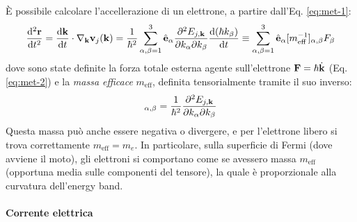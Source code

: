 È possibile calcolare l'accellerazione di un elettrone, a partire dall'Eq. \ref{eq:met-1}:
\begin{equation*}
	\frac{\mathrm{d}^2 \mathbf{r}}{\mathrm{d} t^2} = \frac{\mathrm{d} \mathbf{k}}{\mathrm{d} t} \cdot \nabla_{\mathbf{k}} \mathbf{v}_j(\mathbf{k}) = \frac{1}{\hbar^2} \sum_{\alpha,\beta = 1}^3 \hat{\mathbf{e}}_\alpha \frac{\partial^2 E_{j,\mathbf{k}}}{\partial k_\alpha \partial k_\beta} \frac{\mathrm{d} (\hbar k_\beta)}{\mathrm{d} t} \equiv \sum_{\alpha,\beta = 1}^3 \hat{\mathbf{e}}_\alpha [m_\text{eff}^{-1}]_{\alpha,\beta} F_\beta
\end{equation*}
dove sono state definite la forza totale esterna agente sull'elettrone $ \mathbf{F} = \hbar \dot{\mathbf{k}} $ (Eq. \ref{eq:met-2}) e la \textit{massa efficace} $ m_\text{eff} $, definita tensorialmente tramite il suo inverso:
\begin{equation}
	[m_\text{eff}^{-1}]_{\alpha,\beta} = \frac{1}{\hbar^2} \frac{\pa^2 E_{j,\ve{k}}}{\pa k_\alpha \pa k_\beta}
\end{equation}
Questa massa può anche essere negativa o divergere, e per l'elettrone libero si trova correttamente $ m_\text{eff} = m_e $. In particolare, sulla superficie di Fermi (dove avviene il moto), gli elettroni si comportano come se avessero massa $ m_\text{eff} $ (opportuna media sulle componenti del tensore), la quale è proporzionale alla curvatura dell'energy band.

\paragraph{Corrente elettrica}

